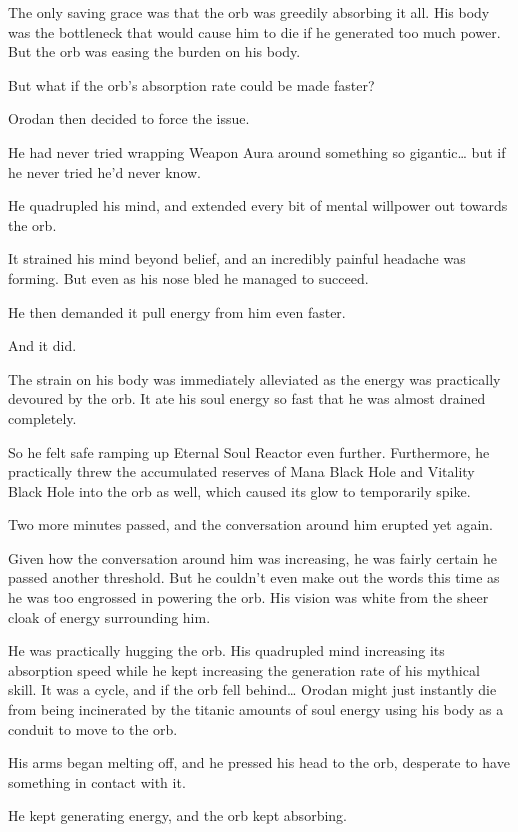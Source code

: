 \documentclass[a4paper,10pt]{book}
\begin{document}
The only saving grace was that the orb was greedily absorbing it all. His body was the bottleneck that would cause him to die if he generated too much power. But the orb was easing the burden on his body.\par
But what if the orb’s absorption rate could be made faster?\par
Orodan then decided to force the issue.\par
He had never tried wrapping Weapon Aura around something so gigantic… but if he never tried he’d never know.\par
He quadrupled his mind, and extended every bit of mental willpower out towards the orb.\par
It strained his mind beyond belief, and an incredibly painful headache was forming. But even as his nose bled he managed to succeed.\par
He then demanded it pull energy from him even faster.\par
And it did.\par
The strain on his body was immediately alleviated as the energy was practically devoured by the orb. It ate his soul energy so fast that he was almost drained completely.\par
So he felt safe ramping up Eternal Soul Reactor even further. Furthermore, he practically threw the accumulated reserves of Mana Black Hole and Vitality Black Hole into the orb as well, which caused its glow to temporarily spike.\par
Two more minutes passed, and the conversation around him erupted yet again.\par
Given how the conversation around him was increasing, he was fairly certain he passed another threshold. But he couldn’t even make out the words this time as he was too engrossed in powering the orb. His vision was white from the sheer cloak of energy surrounding him.\par
He was practically hugging the orb. His quadrupled mind increasing its absorption speed while he kept increasing the generation rate of his mythical skill. It was a cycle, and if the orb fell behind… Orodan might just instantly die from being incinerated by the titanic amounts of soul energy using his body as a conduit to move to the orb.\par
His arms began melting off, and he pressed his head to the orb, desperate to have something in contact with it.\par
He kept generating energy, and the orb kept absorbing.\par
\end{document}
